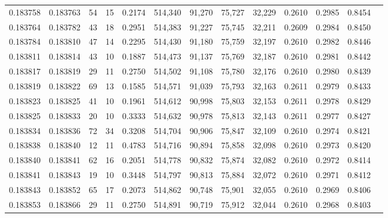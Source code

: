 \begin{tabular}{rrrrrrrrrrrrr}
0.183758 & 0.183763 &    54 &  15 &                                     0.2174 & 514,340 &  91,270 &  75,727 &  32,229 & 0.2610 & 0.2985 & 0.8454 \\
0.183764 & 0.183782 &    43 &  18 &                                     0.2951 & 514,383 &  91,227 &  75,745 &  32,211 & 0.2609 & 0.2984 & 0.8450 \\
0.183784 & 0.183810 &    47 &  14 &                                     0.2295 & 514,430 &  91,180 &  75,759 &  32,197 & 0.2610 & 0.2982 & 0.8446 \\
0.183811 & 0.183814 &    43 &  10 &                                     0.1887 & 514,473 &  91,137 &  75,769 &  32,187 & 0.2610 & 0.2981 & 0.8442 \\
0.183817 & 0.183819 &    29 &  11 &                                     0.2750 & 514,502 &  91,108 &  75,780 &  32,176 & 0.2610 & 0.2980 & 0.8439 \\
0.183819 & 0.183822 &    69 &  13 &                                     0.1585 & 514,571 &  91,039 &  75,793 &  32,163 & 0.2611 & 0.2979 & 0.8433 \\
0.183823 & 0.183825 &    41 &  10 &                                     0.1961 & 514,612 &  90,998 &  75,803 &  32,153 & 0.2611 & 0.2978 & 0.8429 \\
0.183825 & 0.183833 &    20 &  10 &                                     0.3333 & 514,632 &  90,978 &  75,813 &  32,143 & 0.2611 & 0.2977 & 0.8427 \\
0.183834 & 0.183836 &    72 &  34 &                                     0.3208 & 514,704 &  90,906 &  75,847 &  32,109 & 0.2610 & 0.2974 & 0.8421 \\
0.183838 & 0.183840 &    12 &  11 &                                     0.4783 & 514,716 &  90,894 &  75,858 &  32,098 & 0.2610 & 0.2973 & 0.8420 \\
0.183840 & 0.183841 &    62 &  16 &                                     0.2051 & 514,778 &  90,832 &  75,874 &  32,082 & 0.2610 & 0.2972 & 0.8414 \\
0.183841 & 0.183843 &    19 &  10 &                                     0.3448 & 514,797 &  90,813 &  75,884 &  32,072 & 0.2610 & 0.2971 & 0.8412 \\
0.183843 & 0.183852 &    65 &  17 &                                     0.2073 & 514,862 &  90,748 &  75,901 &  32,055 & 0.2610 & 0.2969 & 0.8406 \\
0.183853 & 0.183866 &    29 &  11 &                                     0.2750 & 514,891 &  90,719 &  75,912 &  32,044 & 0.2610 & 0.2968 & 0.8403 \\

\end{tabular}
